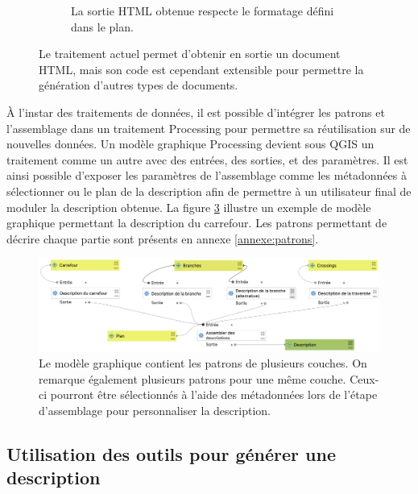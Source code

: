 \begin{figure}[ht]
\begin{subfigure}[t]{.49\linewidth}
        \caption{La sortie HTML obtenue respecte le formatage défini dans le plan.}
        \label{fig:experimentation_assemblage_html}
    \end{subfigure}
    \caption[Fenêtre QGIS de l'assemblage des descriptions]{Le traitement actuel permet d'obtenir en sortie un document HTML, mais son code est cependant extensible pour permettre la génération d'autres types de documents.}
    \label{fig:experimentation_assemblage}
\end{figure}

\newpar{}

À l'instar des traitements de données, il est possible d'intégrer les patrons et l'assemblage dans un traitement Processing pour permettre sa réutilisation sur de nouvelles données. Un modèle graphique Processing devient sous QGIS un traitement comme un autre avec des entrées, des sorties, et des paramètres. Il est ainsi possible d'exposer les paramètres de l'assemblage comme les métadonnées à sélectionner ou le plan de la description afin de permettre à un utilisateur final de moduler la description obtenue. La figure \ref{fig:experimentation_qgis2desc_modele_assemblage} illustre un exemple de modèle graphique permettant la description du carrefour. Les patrons permettant de décrire chaque partie sont présents en annexe \ref{annexe:patrons}.

\begin{figure}[ht]
    \centering
    \includegraphics[width=\textwidth]{images/experimentation/qgis2desc_modele_assemblage.png}
    \caption[Modèle graphique QGIS pour générer une description]{Le modèle graphique contient les patrons de plusieurs couches. On remarque également plusieurs patrons pour une même couche. Ceux-ci pourront être sélectionnés à l'aide des métadonnées lors de l'étape d'assemblage pour personnaliser la description.}
    \label{fig:experimentation_qgis2desc_modele_assemblage}
\end{figure}

\subsection{Utilisation des outils pour générer une description}

